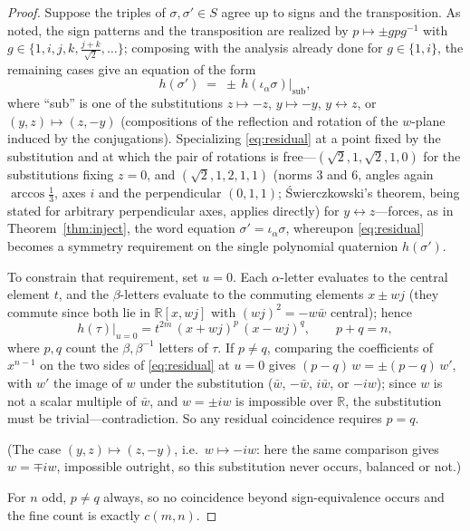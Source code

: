 \documentclass[11pt]{article}
\theoremstyle{definition}
\theoremstyle{remark}
\newcommand{\RR}{\mathbb{R}}
\newcommand{\bw}{\bar{w}}
\newcommand{\ia}{\iota_\alpha}
\begin{document}
\begin{proof}
Suppose the triples of $\sigma,\sigma'\in S$ agree up to signs and the transposition. As noted, the sign patterns and the transposition are realized by $p\mapsto \pm g p g^{-1}$ with $g\in\{1,i,j,k,\tfrac{j+k}{\sqrt2},\dots\}$; composing with the analysis already done for $g\in\{1,i\}$, the remaining cases give an equation of the form
\begin{equation}\label{eq:residual}
h(\sigma')\;=\;\pm\,h(\ia\sigma)\big|_{\text{sub}},
\end{equation}
where ``sub'' is one of the substitutions $z\mapsto-z$, $y\mapsto-y$, $y\leftrightarrow z$, or $(y,z)\mapsto(z,-y)$ (compositions of the reflection and rotation of the $w$-plane induced by the conjugations). Specializing \eqref{eq:residual} at a point fixed by the substitution and at which the pair of rotations is free---$(\sqrt2,1,\sqrt2,1,0)$ for the substitutions fixing $z=0$, and $(\sqrt2,1,2,1,1)$ (norms $3$ and $6$, angles again $\arccos\frac13$, axes $i$ and the perpendicular $(0,1,1)$; Świerczkowski's theorem, being stated for arbitrary perpendicular axes, applies directly) for $y\leftrightarrow z$---forces, as in Theorem~\ref{thm:inject}, the word equation $\sigma'=\ia\sigma$, whereupon \eqref{eq:residual} becomes a symmetry requirement on the single polynomial quaternion $h(\sigma')$.

To constrain that requirement, set $u=0$. Each $\alpha$-letter evaluates to the central element $t$, and the $\beta$-letters evaluate to the commuting elements $x\pm wj$ (they commute since both lie in $\RR[x,wj]$ with $(wj)^2=-w\bw$ central); hence
\[
h(\tau)\big|_{u=0}=t^{2m}\,(x+wj)^p\,(x-wj)^q,\qquad p+q=n,
\]
where $p,q$ count the $\beta,\beta^{-1}$ letters of $\tau$. If $p\neq q$, comparing the coefficients of $x^{n-1}$ on the two sides of \eqref{eq:residual} at $u=0$ gives $(p-q)\,w=\pm(p-q)\,w'$, with $w'$ the image of $w$ under the substitution ($\bw$, $-\bw$, $i\bw$, or $-iw$); since $w$ is not a scalar multiple of $\bw$, and $w=\pm iw$ is impossible over $\RR$, the substitution must be trivial---contradiction. So any residual coincidence requires $p=q$.

(The case $(y,z)\mapsto(z,-y)$, i.e.\ $w\mapsto -iw$: here the same comparison gives $w = \mp i w$, impossible outright, so this substitution never occurs, balanced or not.)

For $n$ odd, $p\ne q$ always, so no coincidence beyond sign-equivalence occurs and the fine count is exactly $c(m,n)$.
\end{proof}
\end{document}
